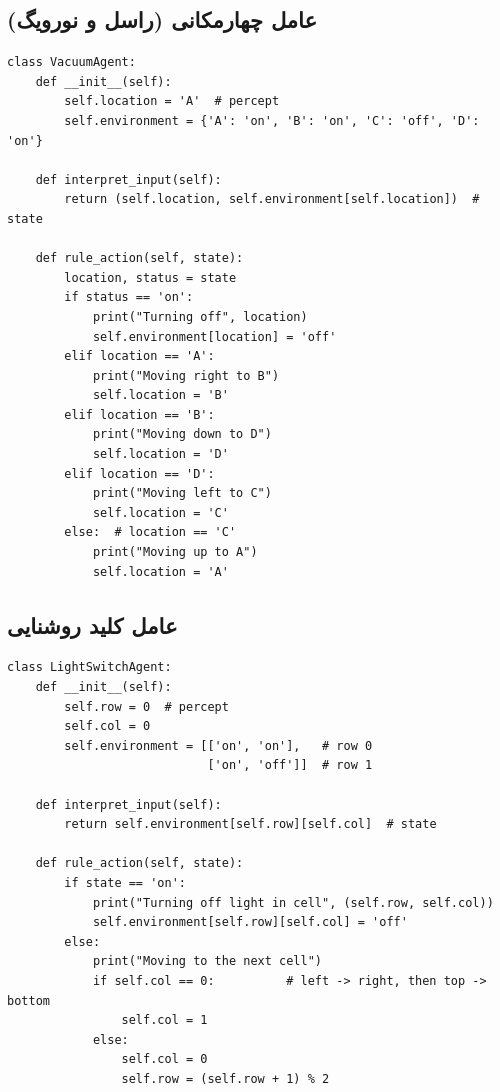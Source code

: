 \documentclass[12pt,a4paper]{article}
\theoremstyle{definition}
\begin{document}
\subsection{عامل چهارمکانی (راسل و نورویگ)}
\begin{latin}
\begin{lstlisting}[caption={عامل ساده‌واکنشی با جدول قواعد}]
class VacuumAgent:
    def __init__(self):
        self.location = 'A'  # percept
        self.environment = {'A': 'on', 'B': 'on', 'C': 'off', 'D': 'on'}

    def interpret_input(self):
        return (self.location, self.environment[self.location])  # state

    def rule_action(self, state):
        location, status = state
        if status == 'on':
            print("Turning off", location)
            self.environment[location] = 'off'
        elif location == 'A':
            print("Moving right to B")
            self.location = 'B'
        elif location == 'B':
            print("Moving down to D")
            self.location = 'D'
        elif location == 'D':
            print("Moving left to C")
            self.location = 'C'
        else:  # location == 'C'
            print("Moving up to A")
            self.location = 'A'
\end{lstlisting}
\end{latin}

\subsection{عامل کلید روشنایی}
\begin{latin}
\begin{lstlisting}[caption={عامل کلید روشنایی در شبکه‌ی $2 \times 2$}]
class LightSwitchAgent:
    def __init__(self):
        self.row = 0  # percept
        self.col = 0
        self.environment = [['on', 'on'],   # row 0
                            ['on', 'off']]  # row 1

    def interpret_input(self):
        return self.environment[self.row][self.col]  # state

    def rule_action(self, state):
        if state == 'on':
            print("Turning off light in cell", (self.row, self.col))
            self.environment[self.row][self.col] = 'off'
        else:
            print("Moving to the next cell")
            if self.col == 0:          # left -> right, then top -> bottom
                self.col = 1
            else:
                self.col = 0
                self.row = (self.row + 1) % 2
\end{lstlisting}
\end{latin}
\end{document}
